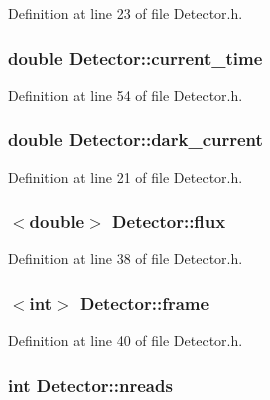 Definition at line 23 of file Detector.h.

\hypertarget{classDetector_a7d1a73b930a0cdc646e9d5e7a75f28e7}{
\subsubsection[{current\_\-time}]{\setlength{\rightskip}{0pt plus 5cm}double {\bf Detector::current\_\-time}}}
\label{classDetector_a7d1a73b930a0cdc646e9d5e7a75f28e7}


Definition at line 54 of file Detector.h.

\hypertarget{classDetector_a8c0b7234e4b96407d8648a42efec4371}{
\subsubsection[{dark\_\-current}]{\setlength{\rightskip}{0pt plus 5cm}double {\bf Detector::dark\_\-current}}}
\label{classDetector_a8c0b7234e4b96407d8648a42efec4371}


Definition at line 21 of file Detector.h.

\hypertarget{classDetector_ac6809aa9b8d5acee17ce16353599d557}{
\subsubsection[{flux}]{$<$double$>$ {\bf Detector::flux}}}
\label{classDetector_ac6809aa9b8d5acee17ce16353599d557}


Definition at line 38 of file Detector.h.

\hypertarget{classDetector_a5082e9a99cae04f03cba0223a0593053}{
\subsubsection[{frame}]{$<$int$>$ {\bf Detector::frame}}}
\label{classDetector_a5082e9a99cae04f03cba0223a0593053}


Definition at line 40 of file Detector.h.

\hypertarget{classDetector_aab6efccaea99c3467b6e0082a7922cb8}{
\subsubsection[{nreads}]{\setlength{\rightskip}{0pt plus 5cm}int {\bf Detector::nreads}}}
\label{classDetector_aab6efccaea99c3467b6e0082a7922cb8}


